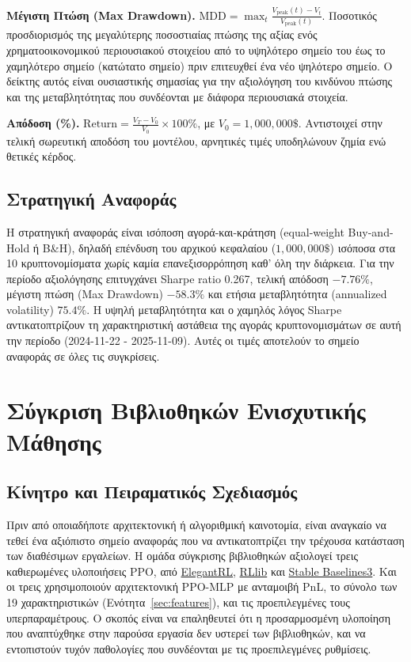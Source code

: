 \textbf{Μέγιστη Πτώση (Max Drawdown).} $\text{MDD} = \max_t \frac{V_{\text{peak}}(t) - V_t}{V_{\text{peak}}(t)}$. 
Ποσοτικός προσδιορισμός της μεγαλύτερης ποσοστιαίας πτώσης της αξίας ενός χρηματοοικονομικού περιουσιακού 
στοιχείου από το υψηλότερο σημείο του έως το χαμηλότερο σημείο (κατώτατο σημείο) πριν επιτευχθεί ένα νέο 
ψηλότερο σημείο. Ο δείκτης αυτός είναι ουσιαστικής σημασίας για την αξιολόγηση του κινδύνου πτώσης και 
της μεταβλητότητας που συνδέονται με διάφορα περιουσιακά στοιχεία.

\textbf{Απόδοση (\%).} $\text{Return} = \frac{V_T - V_0}{V_0} \times 100\%$, με $V_0 = 1{,}000{,}000\$$. 
Αντιστοιχεί στην τελική σωρευτική αποδόση του μοντέλου, αρνητικές τιμές υποδηλώνουν ζημία ενώ θετικές κέρδος.

\subsection{Στρατηγική Αναφοράς}
\label{subsec:exp-baseline}

Η στρατηγική αναφοράς είναι ισόποση αγορά-και-κράτηση (equal-weight Buy-and-Hold ή Β\&Η), δηλαδή 
επένδυση του αρχικού κεφαλαίου ($1{,}000{,}000\$$) ισόποσα στα 10 κρυπτονομίσματα χωρίς καμία 
επανεξισορρόπηση καθ' όλη την διάρκεια. Για την περίοδο αξιολόγησης επιτυγχάνει Sharpe ratio 0{.}267, 
τελική απόδοση $-7{.}76\%$, μέγιστη πτώση (Max Drawdown) $-58{.}3\%$ και ετήσια μεταβλητότητα (annualized volatility) $75{.}4\%$. 
Η υψηλή μεταβλητότητα και ο χαμηλός λόγος Sharpe αντικατοπτρίζουν τη χαρακτηριστική αστάθεια 
της αγοράς κρυπτονομισμάτων σε αυτή την περίοδο (2024-11-22 - 2025-11-09). Αυτές οι τιμές αποτελούν το σημείο αναφοράς σε όλες τις συγκρίσεις.


\section{Σύγκριση Βιβλιοθηκών Ενισχυτικής Μάθησης}
\label{sec:exp-libraries}


\subsection{Κίνητρο και Πειραματικός Σχεδιασμός}
\label{subsec:exp-libraries-design}

Πριν από οποιαδήποτε αρχιτεκτονική ή αλγοριθμική καινοτομία, είναι αναγκαίο να τεθεί ένα 
αξιόπιστο σημείο αναφοράς που να αντικατοπτρίζει την τρέχουσα κατάσταση των διαθέσιμων εργαλείων. 
Η ομάδα σύγκρισης βιβλιοθηκών αξιολογεί τρεις καθιερωμένες υλοποιήσεις PPO, από \href{https://elegantrl.readthedocs.io/en/latest/algorithms/ppo.html}{ElegantRL}, 
\href{https://docs.ray.io/en/latest/rllib/rllib-algorithms.html#ppo}{RLlib} και \href{https://stable-baselines3.readthedocs.io/en/master/modules/ppo.html}{Stable Baselines3}. Και οι τρεις χρησιμοποιούν αρχιτεκτονική PPO-MLP 
με ανταμοιβή PnL, το σύνολο των 19 χαρακτηριστικών (Ενότητα~\ref{sec:features}), και τις προεπιλεγμένες τους υπερπαραμέτρους. 
Ο σκοπός είναι να επαληθευτεί ότι η προσαρμοσμένη υλοποίηση που αναπτύχθηκε στην 
παρούσα εργασία δεν υστερεί των βιβλιοθηκών, και να εντοπιστούν τυχόν παθολογίες που 
συνδέονται με τις προεπιλεγμένες ρυθμίσεις.

